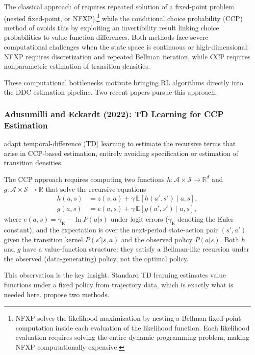 The classical approach of \citet{Rust1987} requires repeated solution of a fixed-point problem (nested fixed-point, or NFXP),\footnote{NFXP solves the likelihood maximization by nesting a Bellman fixed-point computation inside each evaluation of the likelihood function. Each likelihood evaluation requires solving the entire dynamic programming problem, making NFXP computationally expensive.} while the conditional choice probability (CCP) method of \citet{HotzMiller1993} avoids this by exploiting an invertibility result linking choice probabilities to value function differences. Both methods face severe computational challenges when the state space is continuous or high-dimensional: NFXP requires discretization and repeated Bellman iteration, while CCP requires nonparametric estimation of transition densities.

These computational bottlenecks motivate bringing RL algorithms directly into the DDC estimation pipeline. Two recent papers pursue this approach.


\subsubsection{Adusumilli and Eckardt (2022): TD Learning for CCP Estimation}

\citet{AdusumilliEckardt2022} adapt temporal-difference (TD) learning to estimate the recursive terms that arise in CCP-based estimation, entirely avoiding specification or estimation of transition densities.

The CCP approach requires computing two functions $h: \mathcal{A} \times \mathcal{S} \to \mathbb{R}^d$ and $g: \mathcal{A} \times \mathcal{S} \to \mathbb{R}$ that solve the recursive equations
\begin{align}
h(a,s) &= z(s,a) + \gamma \, \mathbb{E}[h(a', s') \mid a, s], \label{eq:ae_h}\\
g(a,s) &= e(a,s) + \gamma \, \mathbb{E}[g(a', s') \mid a, s], \label{eq:ae_g}
\end{align}
where $e(a,s) = \gamma_{\text{E}} - \ln P(a|s)$ under logit errors ($\gamma_{\text{E}}$ denoting the Euler constant), and the expectation is over the next-period state-action pair $(s', a')$ given the transition kernel $P(s'|s,a)$ and the observed policy $P(a|s)$. Both $h$ and $g$ have a value-function structure: they satisfy a Bellman-like recursion under the observed (data-generating) policy, not the optimal policy.

This observation is the key insight. Standard TD learning estimates value functions under a fixed policy from trajectory data, which is exactly what is needed here. \citet{AdusumilliEckardt2022} propose two methods.


